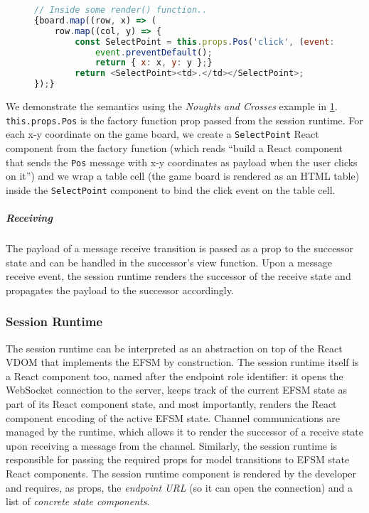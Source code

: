 \begin{figure}[!h]
\begin{lstlisting}[language=JavaScript, tabsize=4]
// Inside some render() function..
{board.map((row, x) => (
	row.map((col, y) => {
		const SelectPoint = this.props.Pos('click', (event: UIEvent) => {
			event.preventDefault();
			return { x: x, y: y };}
		return <SelectPoint><td>.</td></SelectPoint>;
});}
\end{lstlisting}
\label{lst:clientapp}
\end{figure}

We demonstrate the semantics using the \textit{Noughts and Crosses} example in
\cref{lst:clientapp}.
\texttt{this.props.Pos} is the factory function prop
passed from the session runtime.
For each x-y coordinate on the game board, we
create a \texttt{SelectPoint} React component from the factory function (which
reads ``build a React component that sends the \texttt{Pos} message with x-y
coordinates as payload when the user clicks on it'') and we wrap a table cell
(the game board is rendered as an HTML table) inside the \texttt{SelectPoint}
component to bind the click event on the table cell.

\subparagraph{Receiving}
The payload of a message receive transition is passed as
a prop to the successor state and can be handled in the successor's view
function.
Upon a message receive event, the session runtime renders the
successor of the receive state and propagates the payload to the successor
accordingly.

\subsubsection{Session Runtime}
\label{section:clientruntime}

The session runtime can be interpreted as an abstraction on top of the React
VDOM that implements the EFSM by construction.
The session runtime itself is a React component too, named after the endpoint
role identifier:
it opens the WebSocket connection to the server, keeps track of the current
EFSM state as part of its React component state, and most importantly, renders
the React component encoding of the active EFSM state.
Channel communications are managed by the runtime, which allows it to render
the successor of a receive state upon receiving a message from the channel.
Similarly, the session runtime is responsible for passing the required props
for model transitions to EFSM state React components.
The session runtime component is rendered by the developer and requires, as
props, the \textit{endpoint URL} (so it can open the connection) and a list of
\textit{concrete state components}.

